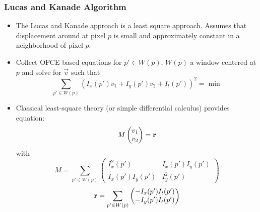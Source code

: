 \documentclass[10pt]{beamer}
\begin{document}
\begin{frame}
  \frametitle{Lucas and Kanade Algorithm}
  \begin{itemize}
  \item The Lucas and Kanade approach is a least square
    approach. Assumes that displacement around at pixel $p$ is small
    and approximately constant in a neighborhood of pixel $p$.\vfill
  \item Collect OFCE based equations for $p'\in W(p)$, $W(p)$ a window centered at $p$ and
    solve for $\vec{v}$ such that
    $$
    \sum_{p'\in W(p)}\left(I_x(p')v_1 + I_y(p')v_2 + I_t(p')\right)^2 = \min
    $$
  \end{itemize}
\end{frame}
\begin{frame}
  \begin{itemize}
  \item Classical least-square theory (or simple differential calculus) provides equation:
    $$
    M
    \begin{pmatrix}
      v_1\\v_2
    \end{pmatrix}
    = 
    {\bf r}
    $$
    with\vfill
    $$ M =  \sum_{p'\in W(p)}
    \begin{pmatrix}
      I_x^2(p') & I_x(p')I_y(p')\\
      I_x(p')I_y(p') & I_y^2(p')
    \end{pmatrix}
    $$\vfill
    $$
    {\bf r} = 
    \sum_{p'\in W(p)}
    \begin{pmatrix}
      -I_x(p')I_t(p')\\
      -I_y(p')I_t(p')
    \end{pmatrix}
    $$
  \end{itemize}
\end{frame}
 
\end{document}
